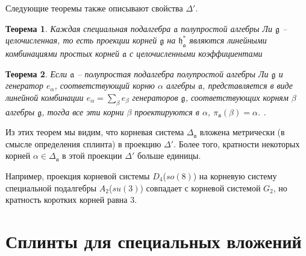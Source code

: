 \documentclass[12pt]{article}
\newtheorem{theorem}{Теорема}
\newcommand{\pia}{\pi_{\mathfrak{a}}}
\newcommand{\gf}{\mathfrak{g}}
\newcommand{\af}{\mathfrak{a}}
\newcommand{\hf}{\mathfrak{h}}
\newcommand{\hfa}{\hf_{\af}}
\begin{document}
Следующие теоремы \cite{dynkin1952semisimpleru} также описывают свойства  $\Delta'$. 

\begin{theorem}\label{dyn1}
  Каждая специальная подалгебра  $\af$ полупростой алгебры Ли  $\gf$ -- целочисленная, то есть
  проекции корней  $\gf$ на $\hfa^{*}$ являются линейными комбинациями простых корней  $\af$ с
  целочисленными коэффициентами \cite{dynkin1952semisimpleru}
\end{theorem}

\begin{theorem}\label{dyn2}
  Если $\af$  -- полупростая подалгебра полупростой алгебры Ли $\gf$ и генератор $e_{\alpha}$,
  соответствующий корню $\alpha$ алгебры $\af$, представляется в виде линейной комбинации  $e_{\alpha}=\sum_{\beta}
  e_{\beta}$ генераторов $\gf$, соответствующих корням  $\beta$ алгебры $\gf$, тогда все эти корни
  $\beta$ проектируются в  $\alpha$,
  $\pia(\beta)=\alpha$. 
  \cite{dynkin1952semisimpleru}. 
\end{theorem}

Из этих теорем мы видим, что  корневая система $\Delta_{\af}$ вложена метрически (в смысле
определения сплинта) в проекцию  $\Delta'$. Более того, кратности некоторых корней 
$\alpha\in\Delta_{\af}$ в этой проекции  $\Delta'$ больше единицы. 

Например, проекция корневой системы $D_{4}$($so(8)$) на корневую систему специальной подалгебры
$A_{2}$($su(3)$) совпадает с корневой системой $G_{2}$, но кратность коротких корней равна $3$.



\section{Сплинты для специальных вложений}
\label{sec:splints-spec-embedd}

\end{document}
